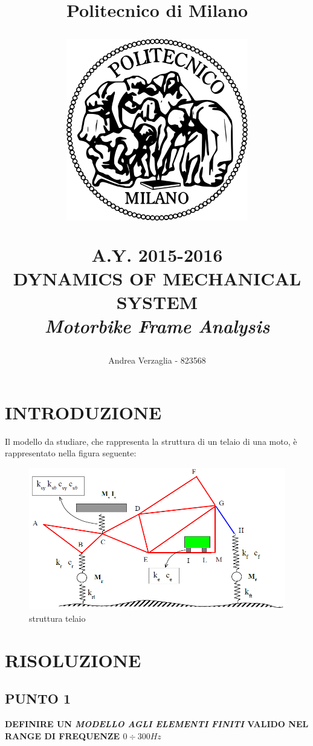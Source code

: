 \documentclass[12pt, a4paper]{article}
\title{\textbf{Politecnico di Milano}\\
		\medskip
		\begin{figure}[h]
			\centering
			\includegraphics[scale=0.25]{logoPOLI}
		\end{figure}
		A.Y. 2015-2016\\
		\medskip 
		\medskip
		\medskip
		{\huge \textbf{DYNAMICS OF MECHANICAL SYSTEM}}\\
		\medskip 
		\medskip 
		\textit{\textbf{Motorbike Frame Analysis}}}
\author{Andrea Verzaglia - 823568}
\date{}
\begin{document}
	\maketitle
	\thispagestyle{empty}
	\clearpage
	\tableofcontents 
	\thispagestyle{empty}
	\clearpage
	\section{INTRODUZIONE}
	Il modello da studiare, che rappresenta la struttura di un telaio di una moto, è rappresentato nella figura seguente:
	\begin{figure}[h]
		\centering
		\includegraphics[scale=0.5]{frame}
		\caption{struttura telaio}
		\label{fig_1}
	\end{figure}
	
	\clearpage
	\section{RISOLUZIONE}
	\subsection{PUNTO 1}
	\textbf{DEFINIRE UN \textit{MODELLO AGLI ELEMENTI FINITI} VALIDO NEL RANGE DI FREQUENZE $0\div300Hz$}
	
\end{document}
